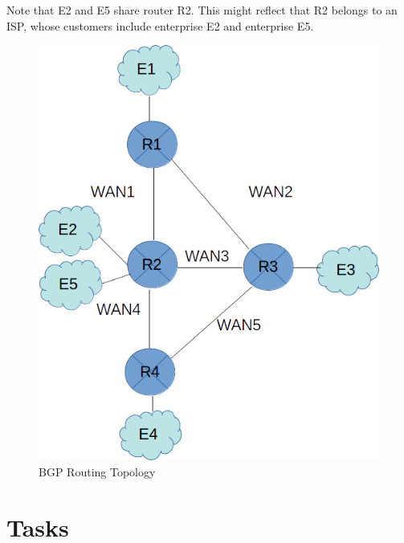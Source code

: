 Note that E2 and E5 share router R2.  This might reflect that R2 belongs to an ISP, whose customers include
enterprise E2 and enterprise E5.  

\begin{figure}[H]
\begin{center}
\includegraphics [width=0.8\linewidth]{topo.png}
\end{center}
\caption{BGP Routing Topology}
\label{fig:topology}
\end{figure}

\section{Tasks}

